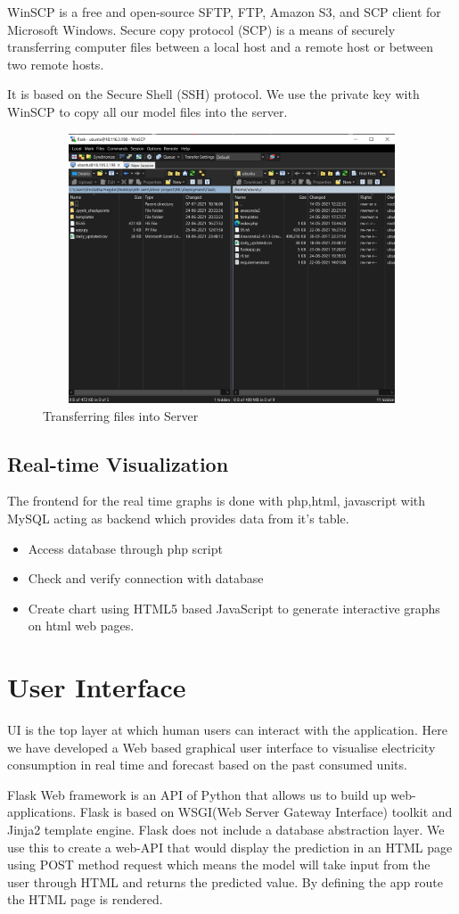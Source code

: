 \documentclass[12 pt]{report}
\begin{document}
 WinSCP is a free and open-source SFTP, FTP, Amazon S3, and SCP client for Microsoft Windows. Secure copy protocol (SCP) is a means of securely transferring computer files between a local host and a remote host or between two remote hosts. \par It is based on the Secure Shell (SSH) protocol.  
We use the private key with WinSCP to copy all our model files into the server.
\begin{figure}[h!]
 \centering
\includegraphics[width=12cm,height = 8cm,frame]{images/scp.png}
\caption{ Transferring files into Server}
\label{fig:Transferring files into Server}
\end{figure}


\subsection{Real-time Visualization}
The frontend for the real time graphs is done with php,html, javascript with MySQL acting as backend which provides data from it's table.
\begin{itemize}
    \item Access database through php script
    \item Check and verify connection with database
    \item Create chart using HTML5  based JavaScript to generate interactive graphs on html web pages.
\end{itemize}



 \section{User Interface}
 UI is the top layer at which human users can interact with the application. Here we have developed a Web based graphical user interface to visualise electricity consumption in real time and forecast based on the past consumed units.\par
Flask Web framework is an API of Python that allows us to build up web-applications. Flask is based on WSGI(Web Server Gateway Interface) toolkit and Jinja2 template engine.  Flask does not include a database abstraction layer. We use this to create a web-API that would display the prediction in an HTML page using POST method request which means the model will take input from the user through HTML and returns the predicted value. By defining the app route the HTML page is rendered.
  
\end{document}
